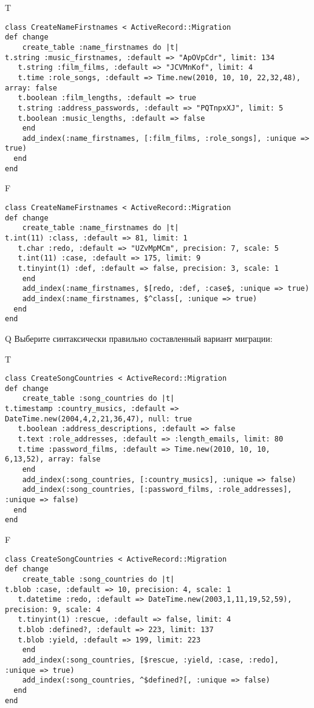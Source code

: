 T
\begin{verbatim}
class CreateNameFirstnames < ActiveRecord::Migration
def change
	create_table :name_firstnames do |t|
t.string :music_firstnames, :default => "ApOVpCdr", limit: 134
   t.string :film_films, :default => "JCVMnKof", limit: 4
   t.time :role_songs, :default => Time.new(2010, 10, 10, 22,32,48), array: false
   t.boolean :film_lengths, :default => true
   t.string :address_passwords, :default => "PQTnpxXJ", limit: 5
   t.boolean :music_lengths, :default => false
   	end
	add_index(:name_firstnames, [:film_films, :role_songs], :unique => true)
  end 
end

\end{verbatim}

F
\begin{verbatim}
class CreateNameFirstnames < ActiveRecord::Migration
def change
	create_table :name_firstnames do |t|
t.int(11) :class, :default => 81, limit: 1
   t.char :redo, :default => "UZvMpMCm", precision: 7, scale: 5
   t.int(11) :case, :default => 175, limit: 9
   t.tinyint(1) :def, :default => false, precision: 3, scale: 1
   	end
	add_index(:name_firstnames, $[redo, :def, :case$, :unique => true)
 	add_index(:name_firstnames, $^class[, :unique => true)
  end 
end

\end{verbatim}

Q
Выберите синтаксически правильно составленный вариант миграции:

T
\begin{verbatim}
class CreateSongCountries < ActiveRecord::Migration
def change
	create_table :song_countries do |t|
t.timestamp :country_musics, :default => DateTime.new(2004,4,2,21,36,47), null: true
   t.boolean :address_descriptions, :default => false
   t.text :role_addresses, :default => :length_emails, limit: 80
   t.time :password_films, :default => Time.new(2010, 10, 10, 6,13,52), array: false
   	end
	add_index(:song_countries, [:country_musics], :unique => false)
 	add_index(:song_countries, [:password_films, :role_addresses], :unique => false)
  end 
end

\end{verbatim}

F
\begin{verbatim}
class CreateSongCountries < ActiveRecord::Migration
def change
	create_table :song_countries do |t|
t.blob :case, :default => 10, precision: 4, scale: 1
   t.datetime :redo, :default => DateTime.new(2003,1,11,19,52,59), precision: 9, scale: 4
   t.tinyint(1) :rescue, :default => false, limit: 4
   t.blob :defined?, :default => 223, limit: 137
   t.blob :yield, :default => 199, limit: 223
   	end
	add_index(:song_countries, [$rescue, :yield, :case, :redo], :unique => true)
 	add_index(:song_countries, ^$defined?[, :unique => false)
  end 
end

\end{verbatim}


